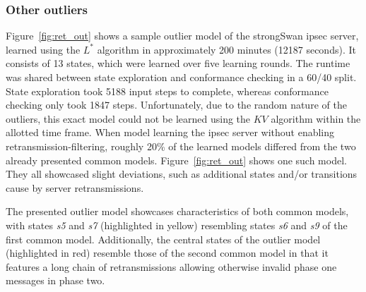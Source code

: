 \subsubsection*{Other outliers}
Figure~\ref{fig:ret_out} shows a sample outlier model of the strongSwan \ac{ipsec} server, learned using the $L^*$ algorithm in approximately 200 minutes (12187 seconds). It consists of 13 states, which were learned over five learning rounds. The runtime was shared between state exploration and conformance checking in a 60/40 split. State exploration took 5188 input steps to complete, whereas conformance checking only took 1847 steps. Unfortunately, due to the random nature of the outliers, this exact model could not be learned using the $KV$ algorithm within the allotted time frame. When model learning the \ac{ipsec} server without enabling retransmission-filtering, roughly 20\% of the learned models differed from the two already presented common models. Figure~\ref{fig:ret_out} shows one such model. They all showcased slight deviations, such as additional states and/or transitions cause by server retransmissions. 

The presented outlier model showcases characteristics of both common models, with states \emph{s5} and \emph{s7} (highlighted in yellow) resembling states \emph{s6} and \emph{s9} of the first common model. Additionally, the central states of the outlier model (highlighted in red) resemble those of the second common model in that it features a long chain of retransmissions allowing otherwise invalid phase one messages in phase two.



